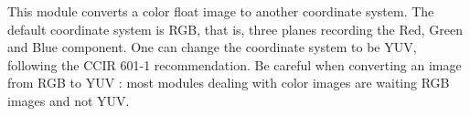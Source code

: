 This module converts a color float image to another coordinate system.
The default coordinate system is RGB, that is, three planes recording
the Red, Green and Blue component.
One can change the coordinate system to be YUV, following the 
CCIR 601-1 recommendation.
Be careful when converting an image from RGB to YUV : most modules 
dealing with color images are waiting RGB images and not YUV.

